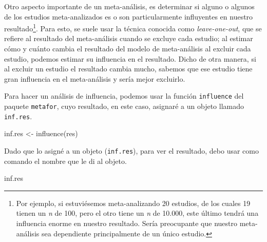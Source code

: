 \documentclass[
  bookmarksnumbered]{article}
\newenvironment{Shaded}{\begin{snugshade}}{\end{snugshade}}
\newcommand{\FunctionTok}[1]{\textcolor[rgb]{0.39,0.29,0.61}{#1}}
\newcommand{\NormalTok}[1]{\textcolor[rgb]{0.12,0.11,0.11}{#1}}
\newcommand{\OtherTok}[1]{\textcolor[rgb]{0.00,0.43,0.16}{#1}}
\begin{document}
Otro aspecto importante de un meta-análisis, es determinar si alguno o algunos de los estudios meta-analizados es o son particularmente influyentes en nuestro resultado\footnote{Por ejemplo, si estuviésemos meta-analizando 20 estudios, de los cuales 19 tienen un \emph{n} de 100, pero el otro tiene un \emph{n} de 10.000, este último tendrá una influencia enorme en nuestro resultado. Sería preocupante que nuestro meta-análisis sea dependiente principalmente de un único estudio.}. Para esto, se suele usar la técnica conocida como \emph{leave-one-out}, que se refiere al resultado del meta-análisis cuando se excluye cada estudio; al estimar cómo y cuánto cambia el resultado del modelo de meta-análisis al excluir cada estudio, podemos estimar su influencia en el resultado. Dicho de otra manera, si al excluir un estudio el resultado cambia mucho, sabemos que ese estudio tiene gran influencia en el meta-análisis y sería mejor excluirlo.

Para hacer un análisis de influencia, podemos usar la función \texttt{influence} del paquete \texttt{metafor}, cuyo resultado, en este caso, asignaré a un objeto llamado \texttt{inf.res}.

\begin{Shaded}
\begin{Highlighting}[]
\NormalTok{inf.res }\OtherTok{\textless{}{-}} \FunctionTok{influence}\NormalTok{(res)}
\end{Highlighting}
\end{Shaded}

Dado que lo asigné a un objeto (\texttt{inf.res}), para ver el resultado, debo usar como comando el nombre que le di al objeto.

\begin{Shaded}
\begin{Highlighting}[]
\NormalTok{inf.res}
\end{Highlighting}
\end{Shaded}
\end{document}
